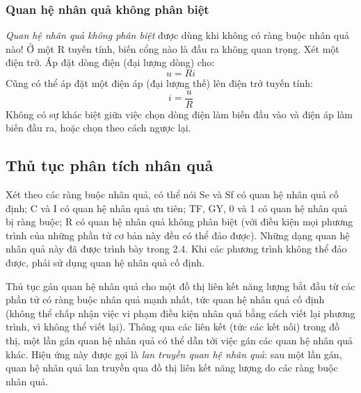 \subsubsection{Quan hệ nhân quả không phân biệt}
\emph{Quan hệ nhân quả không phân biệt} được dùng khi không có ràng buộc nhân quả nào! Ở một R tuyến tính, biến cổng nào là đầu ra không quan trọng. Xét một điện trở. Áp đặt dòng điện (đại lượng dòng) cho:
\[u=Ri\]
Cũng có thể áp đặt một điện áp (đại lượng thế) lên điện trở tuyến tính:
\[i=\frac{u}{R}\]
Không có sự khác biệt giữa việc chọn dòng điện làm biến đầu vào và điện áp làm biến đầu ra, hoặc chọn theo cách ngược lại.

\subsection{Thủ tục phân tích nhân quả}
Xét theo các ràng buộc nhân quả, có thể nói Se và Sf có quan hệ nhân quả cố định; C và I có quan hệ nhân quả ưu tiên; TF, GY, 0 và 1 có quan hệ nhân quả bị ràng buộc; R có quan hệ nhân quả không phân biệt (với điều kiện mọi phương trình của những phần tử cơ bản này đều có thể đảo được). Những dạng quan hệ nhân quả này đã được trình bày trong 2.4. Khi các phương trình không thể đảo được, phải sử dụng quan hệ nhân quả cố định.

Thủ tục gán quan hệ nhân quả cho một đồ thị liên kết năng lượng bắt đầu từ các phần tử có ràng buộc nhân quả mạnh nhất, tức quan hệ nhân quả cố định (không thể chấp nhận việc vi phạm điều kiện nhân quả bằng cách viết lại phương trình, vì không thể viết lại). Thông qua các liên kết (tức các kết nối) trong đồ thị, một lần gán quan hệ nhân quả có thể dẫn tới việc gán các quan hệ nhân quả khác. Hiệu ứng này được gọi là \emph{lan truyền quan hệ nhân quả}: sau một lần gán, quan hệ nhân quả lan truyền qua đồ thị liên kết năng lượng do các ràng buộc nhân quả.

